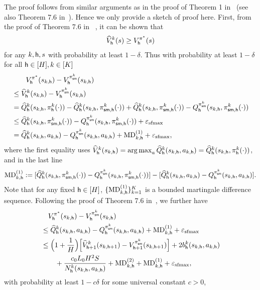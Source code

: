 The proof follows from similar arguments as in the proof of Theorem 1 in~\cite{azar2017minimax} (see also Theorem 7.6 in~\cite{agarwal2019reinforcement}). Hence we only provide a sketch of proof here.
First, from the proof of Theorem 7.6 in~\cite{agarwal2019reinforcement} , it can be shown that 
\begin{align*}
 {\widehat{{{V}}}}_{\mathsf{h}}^k({s})\geq{{V}}^{{\pi^*}}_{\mathsf{h}}({s})
\end{align*}
for any $k,{\mathsf{h}},{s}$ with probability at least $1-\delta$.
Thus with probability at least $1-\delta$ for all ${\mathsf{h}}\in[{H}],k\in[{K}]$
\begin{align*}
&\qquad{{V}}_{\mathsf{h}}^{{\pi^*}}({s}_{k,{\mathsf{h}}})- {{V}}^{{\pi}^k_{\mathsf{sm}}}_{\mathsf{h}}({s}_{k,{\mathsf{h}}})  \\
&\leq
{\widehat{{{V}}}}^k_{\mathsf{h}}({s}_{k,{\mathsf{h}}})- {{V}}^{{\pi}^k_{\mathsf{sm}}}_{\mathsf{h}}({s}_{k,{\mathsf{h}}})  \\
&={\widehat{{Q}}}^k_{\mathsf{h}}({s}_{k,{\mathsf{h}}},{\pi}^k_{{\mathsf{h}}}(\cdot))-{\widehat{{Q}}}^k_{\mathsf{h}}({s}_{k,{\mathsf{h}}},{\pi}^k_{{\mathsf{sm}},{\mathsf{h}}}(\cdot))+{\widehat{{Q}}}^k_{\mathsf{h}}({s}_{k,{\mathsf{h}}},{\pi}^k_{{\mathsf{sm}},{\mathsf{h}}}(\cdot))-
{Q}^{{\pi}^k_{\mathsf{sm}}}_{\mathsf{h}}({s}_{k,{\mathsf{h}}},{\pi}^k_{{\mathsf{sm}},{\mathsf{h}}}(\cdot))\\
&\leq 
{\widehat{{Q}}}^k_{\mathsf{h}}({s}_{k,{\mathsf{h}}},{\pi}^k_{{\mathsf{sm}},{\mathsf{h}}}(\cdot))-
{Q}^{{\pi}^k_{\mathsf{sm}}}_{\mathsf{h}}({s}_{k,{\mathsf{h}}},{\pi}^k_{{\mathsf{sm}},{\mathsf{h}}}(\cdot))+{\varepsilon_{\mathrm{sfmax}}}\\
&=
{\widehat{{Q}}}^k_{\mathsf{h}}({s}_{k,{\mathsf{h}}},{a}_{k,{\mathsf{h}}})-
{Q}^{{\pi}^k_{\mathsf{sm}}}_{\mathsf{h}}({s}_{k,{\mathsf{h}}},{a}_{k,{\mathsf{h}}})+{\mathrm{MD}}^{(1)}_{k,{\mathsf{h}}}+{\varepsilon_{\mathrm{sfmax}}},
\end{align*}
where the first equality uses ${\widehat{{{V}}}}^k_{\mathsf{h}}({s}_{k,{\mathsf{h}}})=\operatorname*{arg\,max}_{{a}}{\widehat{{Q}}}^k_{\mathsf{h}}({s}_{k,{\mathsf{h}}},{a}_{k,{\mathsf{h}}})={\widehat{{Q}}}^k_{\mathsf{h}}({s}_{k,{\mathsf{h}}},{\pi}_{\mathsf{h}}^k(\cdot))$, and in the last line $$
{\mathrm{MD}}^{(1)}_{k,{\mathsf{h}}}:=[{\widehat{{Q}}}^k_{\mathsf{h}}({s}_{k,{\mathsf{h}}},{\pi}^k_{{\mathsf{sm}},{\mathsf{h}}}(\cdot))-
{Q}^{{\pi}^k_{\mathsf{sm}}}_{\mathsf{h}}({s}_{k,{\mathsf{h}}},{\pi}^k_{{\mathsf{sm}},{\mathsf{h}}}(\cdot))]-[{\widehat{{Q}}}^k_{\mathsf{h}}({s}_{k,{\mathsf{h}}},{a}_{k,{\mathsf{h}}})-
{Q}^{{\pi}^k_{\mathsf{sm}}}_{\mathsf{h}}({s}_{k,{\mathsf{h}}},{a}_{k,{\mathsf{h}}})].
$$  Note that for any fixed ${\mathsf{h}}\in[{H}]$, $\{{\mathrm{MD}}^{(1)}_{k,{\mathsf{h}}}\}_{k=1}^{{K}}$ is a bounded martingale difference sequence. Following  the proof of Theorem 7.6 in~\cite{agarwal2019reinforcement}, we further have 
\begin{align*}
&\quad{{V}}_{\mathsf{h}}^{{\pi^*}}({s}_{k,{\mathsf{h}}})- {{V}}^{{\pi}^k_{\mathsf{sm}}}_{\mathsf{h}}({s}_{k,{\mathsf{h}}})\\  
&\leq {\widehat{{Q}}}^k_{\mathsf{h}}({s}_{k,{\mathsf{h}}},{a}_{k,{\mathsf{h}}})-
{Q}^{{\pi}^k_{\mathsf{sm}}}_{\mathsf{h}}({s}_{k,{\mathsf{h}}},{a}_{k,{\mathsf{h}}})+
{\mathrm{MD}}^{(1)}_{k,{\mathsf{h}}}+{\varepsilon_{\mathrm{sfmax}}}\\
&\leq
\Big(1+\frac{1}{{H}}\Big)\Big[{\widehat{{{V}}}}_{{\mathsf{h}}+1}^k({s}_{k,{\mathsf{h}}+1})- {{V}}^{{\pi}^k_{\mathsf{sm}}}_{{\mathsf{h}}+1}({s}_{k,{\mathsf{h}}+1})  \Big]+2{b}_{\mathsf{h}}^k({s}_{k,{\mathsf{h}}},{a}_{k,{\mathsf{h}}})
\\
&\qquad+
\frac{c_0L_0{H}^2{S}}{{N}^k_{\mathsf{h}}({s}_{k,{\mathsf{h}}},{a}_{k,{\mathsf{h}}})}+{\mathrm{MD}}^{(2)}_{k,{\mathsf{h}}}+{\mathrm{MD}}^{(1)}_{k,{\mathsf{h}}}+{\varepsilon_{\mathrm{sfmax}}},
\end{align*}with probability at least $1-c\delta$ for some universal constant $c>0$, 
